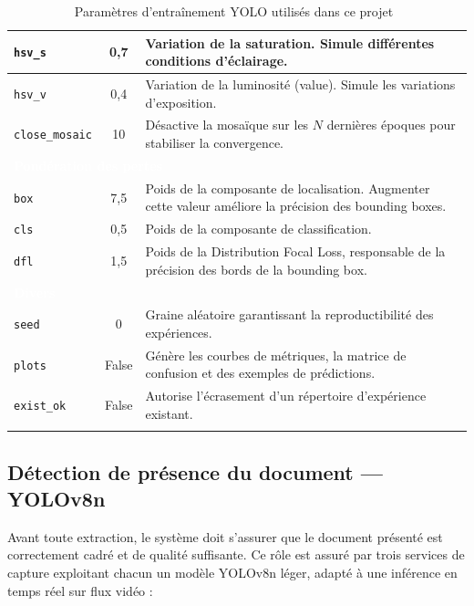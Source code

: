 \begin{longtable}{|l|c|p{8.5cm}|}
  \hline
  \texttt{hsv\_s} & 0,7 & Variation de la saturation. Simule différentes conditions d'éclairage. \\
  \hline
  \texttt{hsv\_v} & 0,4 & Variation de la luminosité (value). Simule les variations d'exposition. \\
  \hline
  \texttt{close\_mosaic} & 10 & Désactive la mosaïque sur les $N$ dernières époques pour stabiliser la convergence. \\
  \hline
  \multicolumn{3}{|l|}{\cellcolor{gris_fonce}\textcolor{white}{\textbf{Pondération des pertes}}} \\
  \hline
  \texttt{box} & 7,5 & Poids de la composante de localisation. Augmenter cette valeur améliore la précision des bounding boxes. \\
  \hline
  \texttt{cls} & 0,5 & Poids de la composante de classification. \\
  \hline
  \texttt{dfl} & 1,5 & Poids de la Distribution Focal Loss, responsable de la précision des bords de la bounding box. \\
  \hline
  \multicolumn{3}{|l|}{\cellcolor{gris_fonce}\textcolor{white}{\textbf{Divers}}} \\
  \hline
  \texttt{seed} & 0 & Graine aléatoire garantissant la reproductibilité des expériences. \\
  \hline
  \texttt{plots} & False & Génère les courbes de métriques, la matrice de confusion et des exemples de prédictions. \\
  \hline
  \texttt{exist\_ok} & False & Autorise l'écrasement d'un répertoire d'expérience existant. \\
  \hline
  \caption{Paramètres d'entraînement YOLO utilisés dans ce projet~\protect\footnotemark}
  \label{tab:ref-params-yolo}
\end{longtable}
\clearpage %
\subsection{Détection de présence du document --- YOLOv8n}
\label{subsec:yolov8n-presence}

Avant toute extraction, le système doit s'assurer que le document présenté est correctement cadré et de qualité suffisante. Ce rôle est assuré par trois services de capture exploitant chacun un modèle YOLOv8n léger, adapté à une inférence en temps réel sur flux vidéo :

